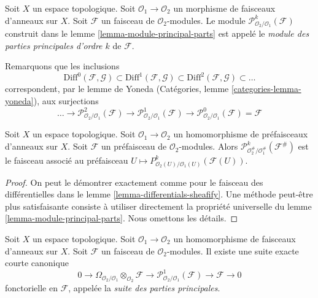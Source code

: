 \begin{definition}
\label{definition-module-principal-parts}
Soit $X$ un espace topologique. Soit
$\mathcal{O}_1 \to \mathcal{O}_2$ un morphisme de faisceaux d'anneaux sur
$X$. Soit $\mathcal{F}$ un faisceau de $\mathcal{O}_2$-modules. Le module
$\mathcal{P}^k_{\mathcal{O}_2/\mathcal{O}_1}(\mathcal{F})$ construit dans le
lemme \ref{lemma-module-principal-parts} est appelé le
{\it module des parties principales d'ordre $k$} de $\mathcal{F}$.
\end{definition}

\noindent
Remarquons que les inclusions
$$
\text{Diff}^0(\mathcal{F}, \mathcal{G}) \subset
\text{Diff}^1(\mathcal{F}, \mathcal{G}) \subset
\text{Diff}^2(\mathcal{F}, \mathcal{G}) \subset \ldots
$$
correspondent, par le lemme de Yoneda (Catégories, lemme
\ref{categories-lemma-yoneda}), aux surjections
$$
\ldots \to \mathcal{P}^2_{\mathcal{O}_2/\mathcal{O}_1}(\mathcal{F})
\to \mathcal{P}^1_{\mathcal{O}_2/\mathcal{O}_1}(\mathcal{F})
\to \mathcal{P}^0_{\mathcal{O}_2/\mathcal{O}_1}(\mathcal{F}) = \mathcal{F}
$$

\begin{lemma}
\label{lemma-differential-operators-sheafify}
Soit $X$ un espace topologique. Soit
$\mathcal{O}_1 \to \mathcal{O}_2$ un homomorphisme de préfaisceaux d'anneaux
sur $X$. Soit $\mathcal{F}$ un préfaisceau de $\mathcal{O}_2$-modules. Alors
$\mathcal{P}^k_{\mathcal{O}_2^\#/\mathcal{O}_1^\#}(\mathcal{F}^\#)$
est le faisceau associé au préfaisceau
$U \mapsto P^k_{\mathcal{O}_2(U)/\mathcal{O}_1(U)}(\mathcal{F}(U))$.
\end{lemma}

\begin{proof}
On peut le démontrer exactement comme pour le faisceau des différentielles
dans le lemme \ref{lemma-differentials-sheafify}. Une méthode peut-être plus
satisfaisante consiste à utiliser directement la propriété universelle du
lemme \ref{lemma-module-principal-parts}. Nous omettons les détails.
\end{proof}

\begin{lemma}
\label{lemma-sequence-of-principal-parts}
Soit $X$ un espace topologique. Soit
$\mathcal{O}_1 \to \mathcal{O}_2$ un homomorphisme de faisceaux d'anneaux
sur $X$. Soit $\mathcal{F}$ un faisceau de $\mathcal{O}_2$-modules. Il
existe une suite exacte courte canonique
$$
0 \to
\Omega_{\mathcal{O}_2/\mathcal{O}_1} \otimes_{\mathcal{O}_2} \mathcal{F} \to
\mathcal{P}^1_{\mathcal{O}_2/\mathcal{O}_1}(\mathcal{F}) \to
\mathcal{F} \to 0
$$
fonctorielle en $\mathcal{F}$, appelée la
{\it suite des parties principales}.
\end{lemma}

